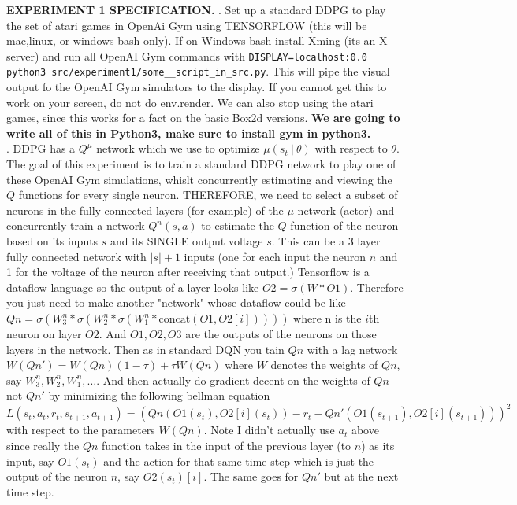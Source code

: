\documentclass{article} %
\numberwithin{equation}{subsection}
\numberwithin{theorem}{subsection}
\begin{document}
\textbf{EXPERIMENT 1 SPECIFICATION.}
. Set up a standard DDPG to play the set of atari games in OpenAi Gym using TENSORFLOW (this will be mac,linux, or windows bash only). If on Windows bash install Xming (its an X server) and run all OpenAI Gym commands with \verb|DISPLAY=localhost:0.0 python3 src/experiment1/some__script_in_src.py|. This will pipe the visual output fo the OpenAI Gym simulators to the display. If you cannot get this to work on your screen, do not do env.render. We can also stop using the atari games, since this works for a fact on the basic Box2d versions. \textbf{We are going to write all of this in Python3, make sure to install gym in python3.}\\
. DDPG has a $Q^\mu$ network which we use to optimize $\mu(s_t\:|\: \theta)$ with respect to $\theta$. The goal of this experiment is to train a standard DDPG network to play one of these OpenAI Gym simulations, whislt concurrently estimating and viewing the $Q$ functions for every single neuron. THEREFORE, we need to select a subset of neurons in the fully connected layers (for example) of the $\mu$ network (actor) and concurrently train a network $Q^n(s,a)$ to estimate the $Q$ function of the neuron based on its inputs $s$ and its SINGLE output voltage $s$. This can be a 3 layer fully connected network with $|s| + 1$ inputs (one for each input the neuron $n$ and 1 for the voltage of the neuron after receiving that output.) Tensorflow is a dataflow language so the output of a layer looks like $O2 = \sigma(W*O1).$ Therefore you just need to make another "network" whose dataflow could be like $Qn = \sigma(W^n_3*\sigma(W^n_2*\sigma(W^n_1*\mathrm{concat}(O1, O2[i]))))$ where n is the $i$th neuron on layer $O2$. And $O1, O2, O3$ are the outputs of the neurons on those layers in the network. Then as in standard DQN you tain $Qn$ with a lag network $W(Qn') = W(Qn)(1-\tau) + \tau W(Qn)$ where $W$ denotes the weights of $Qn$, say $W^n_3, W^n_2, W^n_1, \dots$. And then actually do gradient decent on the weights of $Qn$ not $Qn'$ by minimizing the following bellman equation
\begin{equation*}
  L(s_t, a_t, r_t, s_{t+1}, a_{t+1}) = (Qn(O1(s_t),O2[i](s_t)) - r_t - Qn'(O1(s_{t+1}),O2[i](s_{t+1})))^2
\end{equation*}
with respect to the parameters $W(Qn)$. Note I didn't actually use $a_t$ above since really the $Qn$ function takes in the input of the previous layer (to $n$) as its input, say $O1(s_t)$ and the action for that same time step which is just the output of the neuron $n$, say $O2(s_t)[i]$.  The same goes for $Qn'$ but at the next time step.
\end{document}
